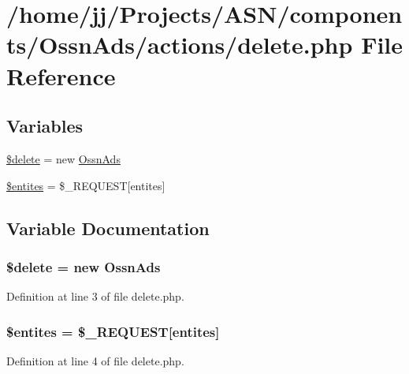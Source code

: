 \hypertarget{components_2_ossn_ads_2actions_2delete_8php}{}\section{/home/jj/\+Projects/\+A\+S\+N/components/\+Ossn\+Ads/actions/delete.php File Reference}
\label{components_2_ossn_ads_2actions_2delete_8php}
\subsection*{Variables}
\begin{DoxyCompactItemize}
\item 
\hyperlink{components_2_ossn_ads_2actions_2delete_8php_aba2374a8b713514611e21494ec2fef8d}{\$delete} = new \hyperlink{class_ossn_ads}{Ossn\+Ads}
\item 
\hyperlink{components_2_ossn_ads_2actions_2delete_8php_a898cd30dc0d0089c3527748f9816dff0}{\$entites} = \$\+\_\+\+R\+E\+Q\+U\+E\+ST\mbox{[}\textquotesingle{}entites\textquotesingle{}\mbox{]}
\end{DoxyCompactItemize}


\subsection{Variable Documentation}
\subsubsection[{\texorpdfstring{\$delete}{$delete}}]{\setlength{\rightskip}{0pt plus 5cm}\$delete = new {\bf Ossn\+Ads}}\hypertarget{components_2_ossn_ads_2actions_2delete_8php_aba2374a8b713514611e21494ec2fef8d}{}\label{components_2_ossn_ads_2actions_2delete_8php_aba2374a8b713514611e21494ec2fef8d}


Definition at line 3 of file delete.\+php.

\subsubsection[{\texorpdfstring{\$entites}{$entites}}]{\setlength{\rightskip}{0pt plus 5cm}\$entites = \$\+\_\+\+R\+E\+Q\+U\+E\+ST\mbox{[}\textquotesingle{}entites\textquotesingle{}\mbox{]}}\hypertarget{components_2_ossn_ads_2actions_2delete_8php_a898cd30dc0d0089c3527748f9816dff0}{}\label{components_2_ossn_ads_2actions_2delete_8php_a898cd30dc0d0089c3527748f9816dff0}


Definition at line 4 of file delete.\+php.

